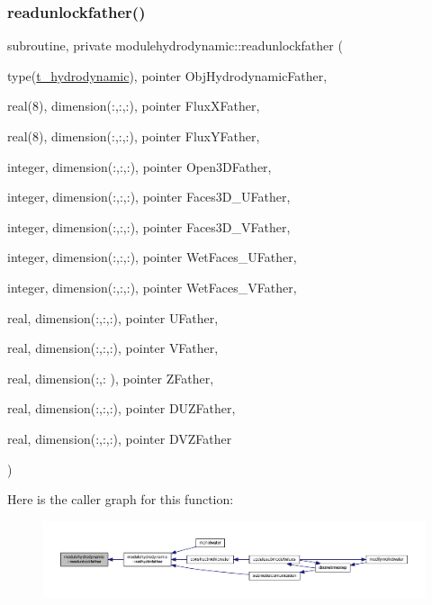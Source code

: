 \subsubsection{\texorpdfstring{readunlockfather()}{readunlockfather()}}
{\footnotesize\ttfamily subroutine, private modulehydrodynamic\+::readunlockfather (\begin{DoxyParamCaption}\item[{type(\mbox{\hyperlink{structmodulehydrodynamic_1_1t__hydrodynamic}{t\+\_\+hydrodynamic}}), pointer}]{Obj\+Hydrodynamic\+Father,  }\item[{real(8), dimension(\+:,\+:,\+:), pointer}]{Flux\+X\+Father,  }\item[{real(8), dimension(\+:,\+:,\+:), pointer}]{Flux\+Y\+Father,  }\item[{integer, dimension(\+:,\+:,\+:), pointer}]{Open3\+D\+Father,  }\item[{integer, dimension(\+:,\+:,\+:), pointer}]{Faces3\+D\+\_\+\+U\+Father,  }\item[{integer, dimension(\+:,\+:,\+:), pointer}]{Faces3\+D\+\_\+\+V\+Father,  }\item[{integer, dimension(\+:,\+:,\+:), pointer}]{Wet\+Faces\+\_\+\+U\+Father,  }\item[{integer, dimension(\+:,\+:,\+:), pointer}]{Wet\+Faces\+\_\+\+V\+Father,  }\item[{real, dimension(\+:,\+:,\+:), pointer}]{U\+Father,  }\item[{real, dimension(\+:,\+:,\+:), pointer}]{V\+Father,  }\item[{real, dimension(\+:,\+:  ), pointer}]{Z\+Father,  }\item[{real, dimension(\+:,\+:,\+:), pointer}]{D\+U\+Z\+Father,  }\item[{real, dimension(\+:,\+:,\+:), pointer}]{D\+V\+Z\+Father }\end{DoxyParamCaption})\hspace{0.3cm}{\ttfamily [private]}}

Here is the caller graph for this function\+:\nopagebreak
\begin{figure}[H]
\begin{center}
\leavevmode
\includegraphics[width=350pt]{namespacemodulehydrodynamic_afeaf24401841ea327d58dcaa1b45a92f_icgraph}
\end{center}
\end{figure}
\mbox{\label{namespacemodulehydrodynamic_a0f4e404d78ffa5a1fef104a6f662d68d}} 
